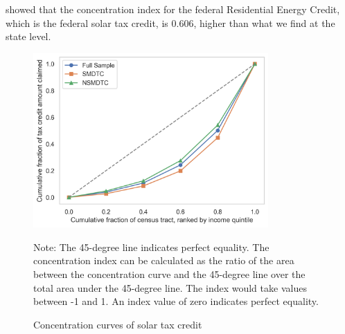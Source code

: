 \documentclass[12pt,twoside,letterpaper]{article}
\begin{document}
\textcite{borenstein_distributional_2016} showed that the concentration index for the federal Residential Energy Credit, which is the federal solar tax credit, is 0.606, higher than what we find at the state level. %

\begin{figure}[!ht]
    \centering
\includegraphics[width=0.8\textwidth]{figures/credit_claim_amount_distribution_by_income.png}
    \caption{Concentration curves of solar tax credit}
    \label{fig:credit_claim_distribution}
    \begin{flushleft}
        \footnotesize Note: The 45-degree line indicates perfect equality. The concentration index can be calculated as the ratio of the area between the concentration curve and the 45-degree line over the total area under the 45-degree line. The index would take values between -1 and 1. An index value of zero indicates perfect equality. 
    \end{flushleft}
\end{figure}
\end{document}
